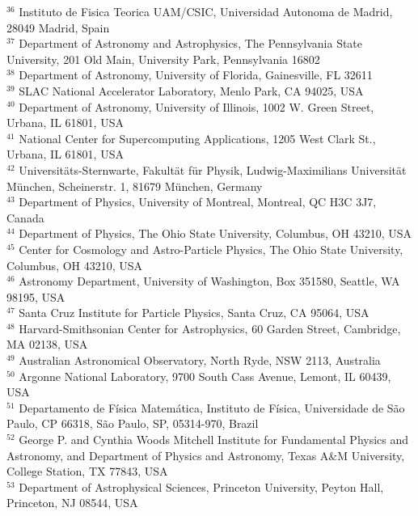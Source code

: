 \documentclass[useAMS,usenatbib,iop,numberedappendix]{mn2e}
\begin{document}
$^{36}$ Instituto de Fisica Teorica UAM/CSIC, Universidad Autonoma de Madrid, 28049 Madrid, Spain\\
$^{37}$ Department of Astronomy and Astrophysics, The Pennsylvania State University, 201 Old Main, University Park, Pennsylvania 16802\\
$^{38}$ Department of Astronomy, University of Florida, Gainesville, FL 32611\\
$^{39}$ SLAC National Accelerator Laboratory, Menlo Park, CA 94025, USA\\
$^{40}$ Department of Astronomy, University of Illinois, 1002 W. Green Street, Urbana, IL 61801, USA\\
$^{41}$ National Center for Supercomputing Applications, 1205 West Clark St., Urbana, IL 61801, USA\\
$^{42}$ Universit\"ats-Sternwarte, Fakult\"at f\"ur Physik, Ludwig-Maximilians Universit\"at M\"unchen, Scheinerstr. 1, 81679 M\"unchen, Germany\\
$^{43}$ Department of Physics, University of Montreal, Montreal, QC H3C 3J7, Canada\\
$^{44}$ Department of Physics, The Ohio State University, Columbus, OH 43210, USA\\
$^{45}$ Center for Cosmology and Astro-Particle Physics, The Ohio State University, Columbus, OH 43210, USA\\
$^{46}$ Astronomy Department, University of Washington, Box 351580, Seattle, WA 98195, USA\\
$^{47}$ Santa Cruz Institute for Particle Physics, Santa Cruz, CA 95064, USA\\
$^{48}$ Harvard-Smithsonian Center for Astrophysics, 60 Garden Street, Cambridge, MA 02138, USA\\
$^{49}$ Australian Astronomical Observatory, North Ryde, NSW 2113, Australia\\
$^{50}$ Argonne National Laboratory, 9700 South Cass Avenue, Lemont, IL 60439, USA\\
$^{51}$ Departamento de F\'isica Matem\'atica, Instituto de F\'isica, Universidade de S\~ao Paulo, CP 66318, S\~ao Paulo, SP, 05314-970, Brazil\\
$^{52}$ George P. and Cynthia Woods Mitchell Institute for Fundamental Physics and Astronomy, and Department of Physics and Astronomy, Texas A\&M University, College Station, TX 77843,  USA\\
$^{53}$ Department of Astrophysical Sciences, Princeton University, Peyton Hall, Princeton, NJ 08544, USA\\
\end{document}
